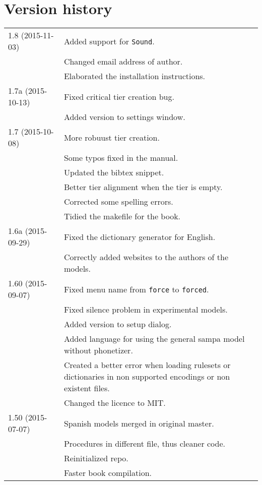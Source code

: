 \section{Version history}
\begin{longtable}{|p{0.22\linewidth}p{0.8\linewidth}|}
	\hline
	1.8 (2015-11-03) & \tabitem Added support for \texttt{Sound}.\\
		& \tabitem Changed email address of author.\\
		& \tabitem Elaborated the installation instructions.\\
	\hline
	1.7a (2015-10-13) & \tabitem Fixed critical tier creation bug.\\
	& \tabitem Added version to settings window.\\
	\hline
	1.7 (2015-10-08) & \tabitem More robuust tier creation.\\
		& \tabitem Some typos fixed in the manual.\\
		& \tabitem Updated the bibtex snippet.\\
		&	\tabitem Better tier alignment when the tier is empty.\\
		&	\tabitem Corrected some spelling errors.\\
		&	\tabitem Tidied the makefile for the book.\\
	\hline
	1.6a (2015-09-29) & \tabitem Fixed the dictionary generator for English.\\
		& \tabitem Correctly added websites to the authors of the models.\\
	\hline
	1.60 (2015-09-07) & \tabitem Fixed menu name from \texttt{force} to
\texttt{forced}.\\
		& \tabitem Fixed silence problem in experimental models.\\
		& \tabitem Added version to setup dialog.\\
		& \tabitem Added language for using the general sampa model without
			phonetizer.\\
		& \tabitem Created a better error when loading rulesets or dictionaries in
			non supported encodings or non existent files.\\
		& \tabitem Changed the licence to MIT.\\
	\hline
	1.50 (2015-07-07) & \tabitem Spanish models merged in original master.\\
		& \tabitem Procedures in different file, thus cleaner code.\\
		& \tabitem Reinitialized repo.\\
		& \tabitem Faster book compilation.\\

\end{longtable}
